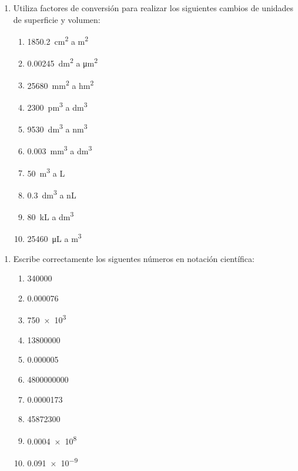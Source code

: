 \documentclass[
]{article}
\providecommand{\tightlist}{%
  \setlength{\itemsep}{0pt}\setlength{\parskip}{0pt}}
\begin{document}
\begin{enumerate}
\def\labelenumi{\arabic{enumi}.}
\setcounter{enumi}{2}
\tightlist
\item
  Utiliza factores de conversión para realizar los siguientes cambios de
  unidades de superficie y volumen:

  \begin{enumerate}
  \def\labelenumii{\alph{enumii})}
  \tightlist
  \item
    \SI{1850.2}{\square\cm} a \si{\square\m}
  \item
    \SI{0.00245}{\square\deca\m} a \si{\square\um}
  \item
    \SI{25680}{\square\mm} a \si{\square\hecto\m}
  \item
    \SI{2300}{\cubic\pm} a \si{\cubic\dm}
  \item
    \SI{9530}{\cubic\deca\m} a \si{\cubic\nm}
  \item
    \SI{0.003}{\cubic\mm} a \si{\cubic\deca\m}
  \item
    \SI{50}{\cubic\m} a \si{\L}
  \item
    \SI{0.3}{\cubic\dm} a \si{\nano\L}
  \item
    \SI{80}{\kilo\L} a \si{\cubic\dm}
  \item
    \SI{25460}{\uL} a \si{\cubic\m}
  \end{enumerate}
\end{enumerate}

\begin{enumerate}
\def\labelenumi{\arabic{enumi}.}
\setcounter{enumi}{3}
\tightlist
\item
  Escribe correctamente los siguentes números en notación científica:

  \begin{enumerate}
  \def\labelenumii{\alph{enumii})}
  \tightlist
  \item
    \num{340000}
  \item
    \num{0.000076}
  \item
    \num{750e3}
  \item
    \num{13800000}
  \item
    \num{0.000005}
  \item
    \num{4800000000}
  \item
    \num{0.0000173}
  \item
    \num{45872300}
  \item
    \num{0.0004e8}
  \item
    \num{0.091e-9}
  \end{enumerate}
\end{enumerate}
\end{document}
